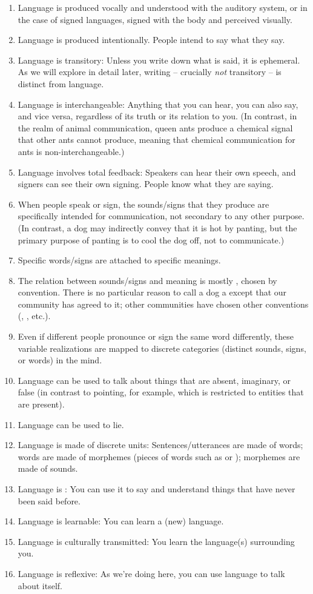 \begin{enumerate}
    \item Language is produced vocally and understood with the auditory system, or in the case of signed languages, signed with the body and perceived visually.
    \item Language is produced intentionally. People intend to say what they say.
    \item Language is transitory: Unless you write down what is said, it is ephemeral.  As we will explore in detail later, writing -- crucially \emph{not} transitory -- is distinct from language.
    \item Language is interchangeable: Anything that you can hear, you can also say, and vice versa, regardless of its truth or its relation to you. (In contrast, in the realm of animal communication, queen ants produce a chemical signal that other ants cannot produce, meaning that chemical communication for ants is non-interchangeable.)
    \item Language involves total feedback: Speakers can hear their own speech, and signers can see their own signing.  People know what they are saying.
    \item When people speak or sign, the sounds/signs that they produce are specifically intended for communication, not secondary to any other purpose.  (In contrast, a dog may indirectly convey that it is hot by panting, but the primary purpose of panting is to cool the dog off, not to communicate.)
    \item Specific words/signs are attached to specific meanings.
    \item The relation between sounds/signs and meaning is mostly , chosen by convention.  There is no particular reason to call a dog a  except that our community has agreed to it; other communities have chosen other conventions (, , etc.).
    \item Even if different people pronounce or sign the same word differently, these  variable realizations are mapped to discrete categories (distinct sounds, signs, or words) in the mind.
    \item Language can be used to talk about things that are absent, imaginary, or false (in contrast to pointing, for example, which is restricted to entities that are present).
    \item Language can be used to lie.
    \item Language is made of discrete units: Sentences/utterances are made of words; words are made of morphemes (pieces of words such as  or ); morphemes are made of sounds.
    \item Language is : You can use it to say and understand things that have never been said before.
    \item Language is learnable: You can learn a (new) language.
    \item Language is culturally transmitted: You learn the
      language(s) surrounding you.
    \item Language is reflexive: As we're doing here, you can use language to talk about itself.


\end{enumerate}
